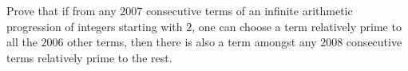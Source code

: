 Prove that if from any $2007$ consecutive terms of an infinite arithmetic progression of integers starting with $2$, one can choose a term relatively prime to all the $2006$ other terms, then there is also a term amongst any $2008$ consecutive terms relatively prime to the rest.